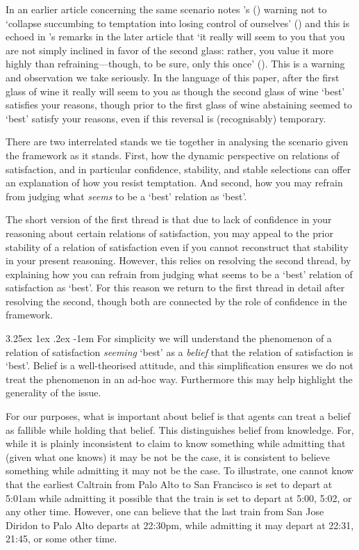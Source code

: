 \documentclass[10pt]{article}
\makeatletter
\renewcommand\paragraph{\@startsection{paragraph}{5}{\z@}%
  {3.25ex \@plus1ex \@minus.2ex}%
  {-1em}%
  {\normalfont\normalsize\bfseries}}
\makeatother
\begin{document}
In an earlier article concerning the same scenario \citeauthor{Bratman:1999ac} notes \citeauthor{Austin:1961aa}'s (\citeyear{Austin:1961aa}) warning not to `collapse succumbing to temptation into losing control of ourselves' (\citeyear[38]{Bratman:1999ac}) and this is echoed in \citeauthor{Bratman:2007ab}'s remarks in the later article that `it really will seem to you that you are not simply inclined in favor of the second glass: rather, you value it more highly than refraining---though, to be sure, only this once' (\citeyear[258]{Bratman:2007ab}).
This is a warning and observation we take seriously.
In the language of this paper, after the first glass of wine it really will seem to you as though the second glass of wine `best' satisfies your reasons, though prior to the first glass of wine abstaining seemed to `best' satisfy your reasons, even if this reversal is (recognisably) temporary.

There are two interrelated stands we tie together in analysing the scenario given the framework as it stands.
First, how the dynamic perspective on relations of satisfaction, and in particular confidence, stability, and stable selections can offer an explanation of how you resist temptation.
And second, how you may refrain from judging what \emph{seems} to be a `best' relation as `best'.

The short version of the first thread is that due to lack of confidence in your reasoning about certain relations of satisfaction, you may appeal to the prior stability of a relation of satisfaction even if you cannot reconstruct that stability in your present reasoning.
However, this relies on resolving the second thread, by explaining how you can refrain from judging what seems to be a `best' relation of satisfaction as `best'.
For this reason we return to the first thread in detail after resolving the second, though both are connected by the role of confidence in the framework.

\paragraph{ } %
For simplicity we will understand the phenomenon of a relation of satisfaction \emph{seeming} `best' as a \emph{belief} that the relation of satisfaction is `best'.
Belief is a well-theorised attitude, and this simplification ensures we do not treat the phenomenon in an ad-hoc way.
Furthermore this may help highlight the generality of the issue.

For our purposes, what is important about belief is that agents can treat a belief as fallible while holding that belief.
This distinguishes belief from knowledge.
For, while it is plainly inconsistent to claim to know something while admitting that (given what one knows) it may be not be the case, it is consistent to believe something while admitting it may not be the case.
To illustrate, one cannot know that the earliest Caltrain from Palo Alto to San Francisco is set to depart at 5:01am while admitting it possible that the train is set to depart at 5:00, 5:02, or any other time.
However, one can believe that the last train from San Jose Diridon to Palo Alto departs at 22:30pm, while admitting it may depart at 22:31, 21:45, or some other time.
\end{document}
